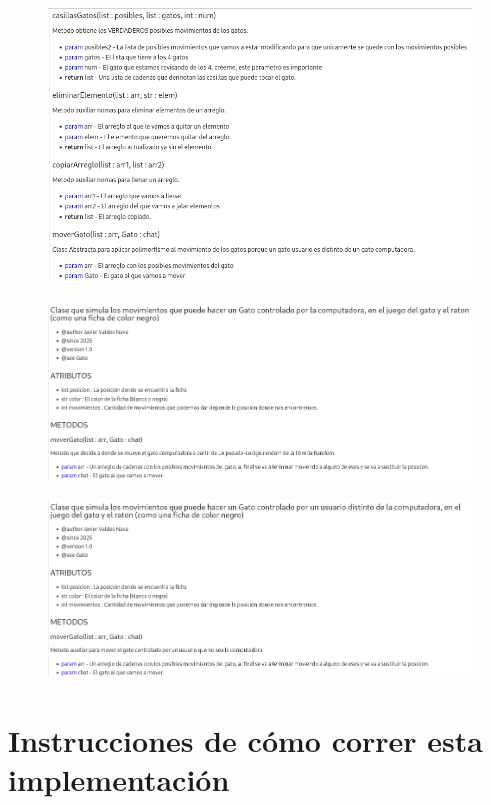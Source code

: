\documentclass[12pt, Tahoma]{article}
\begin{document}
	\begin{figure}[H]
		\centering
		\includegraphics[scale=0.5]{ClaseGato2.png}
	\end{figure}
	\begin{figure}[H]
		\centering
		\includegraphics[scale=0.5]{ClaseGatoCPU.png}
	\end{figure}
	\begin{figure}[H]
		\centering
		\includegraphics[scale=0.5]{ClaseGatoNOCPU.png}
	\end{figure}
	
	
	\section*{Instrucciones de cómo correr esta implementación}
	
\end{document}
